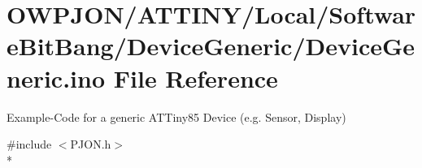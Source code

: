 \hypertarget{ATTINY_2Local_2SoftwareBitBang_2DeviceGeneric_2DeviceGeneric_8ino}{\section{O\-W\-P\-J\-O\-N/\-A\-T\-T\-I\-N\-Y/\-Local/\-Software\-Bit\-Bang/\-Device\-Generic/\-Device\-Generic.ino File Reference}
\label{ATTINY_2Local_2SoftwareBitBang_2DeviceGeneric_2DeviceGeneric_8ino}
}


Example-\/\-Code for a generic A\-T\-Tiny85 Device (e.\-g. Sensor, Display)  


{\ttfamily \#include $<$P\-J\-O\-N.\-h$>$}\\*
